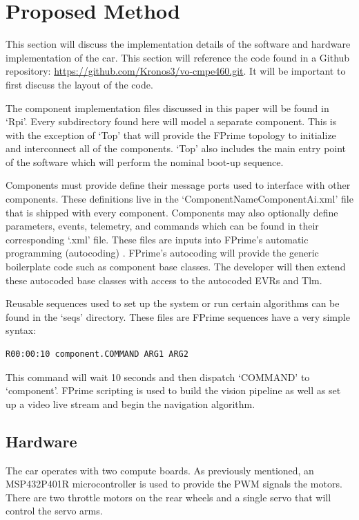 \documentclass{article}
\begin{document}
\section{Proposed Method}

This section will discuss the implementation details of the software and hardware
implementation of the car. This section will reference the code found
in a Github repository: \url{https://github.com/Kronos3/vo-cmpe460.git}. It will
be important to first discuss the layout of the code.

The component implementation files discussed in this paper will be found in `Rpi'.
Every subdirectory found here will model a separate component. This is with the
exception of `Top' that will provide the FPrime topology to initialize and interconnect
all of the components. `Top' also includes the main entry point of the software
which will perform the nominal boot-up sequence.

Components must provide define their message ports used to interface with other
components. These definitions live in the `ComponentNameComponentAi.xml' file
that is shipped with every component. Components may also optionally define
parameters, events, telemetry, and commands which can be found in their corresponding
`.xml' file. These files are inputs into FPrime's automatic programming (autocoding)
\cite{b4}. FPrime's autocoding will provide the generic boilerplate code such as
component base classes. The developer will then extend these autocoded base classes
with access to the autocoded EVRs and Tlm.

Reusable sequences used to set up the system or run certain algorithms can be
found in the `seqs' directory. These files are FPrime sequences have a very
simple syntax:

\begin{verbatim}
R00:00:10 component.COMMAND ARG1 ARG2
\end{verbatim}

This command will wait 10 seconds and then dispatch `COMMAND' to `component'.
FPrime scripting is used to build the vision pipeline as well as set up a video
live stream and begin the navigation algorithm.

\subsection{Hardware}

The car operates with two compute boards. As previously mentioned,
an MSP432P401R microcontroller is used to provide the PWM signals the motors.
There are two throttle motors on the rear wheels and a single servo that will
control the servo arms. 
\end{document}
